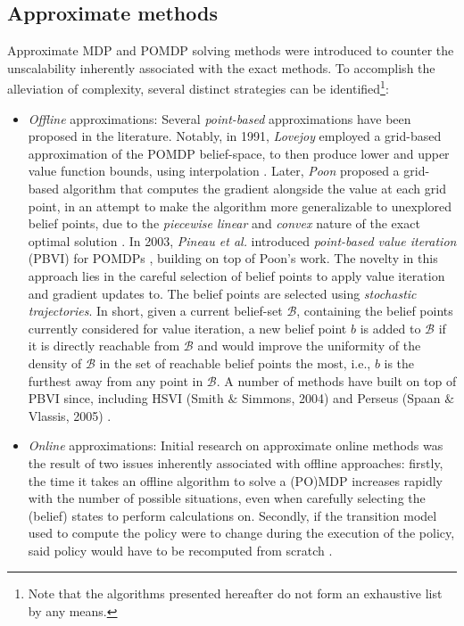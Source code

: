 \subsection{Approximate methods}
Approximate MDP and POMDP solving methods were introduced to counter the unscalability inherently associated with the exact methods. To accomplish the alleviation of complexity, several distinct strategies can be identified\footnote{Note that the algorithms presented hereafter do not form an exhaustive list by any means.}:
\begin{itemize}
    \item \textit{Offline} approximations: Several \textit{point-based} approximations have been proposed in the literature. Notably, in 1991, \textit{Lovejoy} employed a grid-based approximation of the POMDP belief-space, to then produce lower and upper value function bounds, using interpolation \cite{Lovejoy1991ComputationallyFB}. Later, \textit{Poon} proposed a grid-based algorithm that computes the gradient alongside the value at each grid point, in an attempt to make the algorithm more generalizable to unexplored belief points, due to the \textit{piecewise linear} and \textit{convex} nature of the exact optimal solution \cite{Poon2001AFH}. In 2003, \textit{Pineau et al.} introduced \textit{point-based value iteration} (PBVI) for POMDPs \cite{Pineau-2003-8730}, building on top of Poon's work. The novelty in this approach lies in the careful selection of belief points to apply value iteration and gradient updates to. The belief points are selected using \textit{stochastic trajectories}. In short, given a current belief-set $\mathcal{B}$, containing the belief points currently considered for value iteration, a new belief point $b$ is added to $\mathcal{B}$ if it is directly reachable from $\mathcal{B}$ and would improve the uniformity of the density of $\mathcal{B}$ in the set of reachable belief points the most, i.e., $b$ is the furthest away from any point in $\mathcal{B}$. A number of methods have built on top of PBVI since, including HSVI (Smith $\&$ Simmons, 2004) \cite{hsvi} and Perseus (Spaan $\&$ Vlassis, 2005) \cite{perseus}.
    \item \textit{Online} approximations: Initial research on approximate online methods was the result of two issues inherently associated with offline approaches: firstly, the time it takes an offline algorithm to solve a (PO)MDP increases rapidly with the number of possible situations, even when carefully selecting the (belief) states to perform calculations on. Secondly, if the transition model used to compute the policy were to change during the execution of the policy, said policy would have to be recomputed from scratch \cite{offlineonline}. 
    

\end{itemize}
